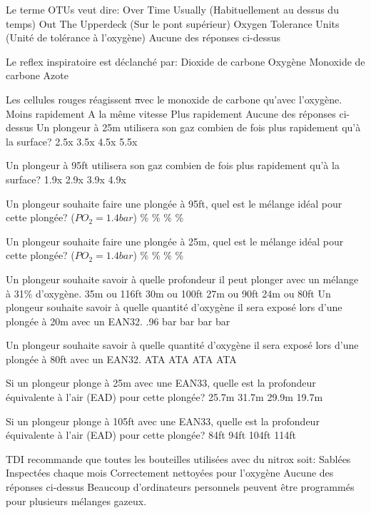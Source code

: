 \documentclass[english,10pt,a4paper, twoside]{article}
\begin{document}
\begin{outline}
		\1 Le terme OTUs veut dire:
			\2 Over Time Usually (Habituellement au dessus du temps)
			\2 Out The Upperdeck (Sur le pont supérieur)
			\2 Oxygen Tolerance Units (Unité de tolérance à l'oxygène)
			\2 Aucune des réponses ci-dessus

		\1 Le reflex inspiratoire est déclanché par:
			\2 Dioxide de carbone
			\2 Oxygène
			\2 Monoxide de carbone
			\2 Azote			

		\1 Les cellules rouges réagissent \st avec le monoxide de carbone qu'avec l'oxygène.
			\2 Moins rapidement
			\2 A la même vitesse
			\2 Plus rapidement
			\2 Aucune des réponses ci-dessus
		\1 Un plongeur à 25m utilisera son gaz combien de fois plus rapidement qu'à la surface?
			\2 2.5x
			\2 3.5x
			\2 4.5x
			\2 5.5x

		\1 Un plongeur à 95ft utilisera son gaz combien de fois plus rapidement qu'à la surface?
			\2 1.9x
			\2 2.9x
			\2 3.9x
			\2 4.9x

		\1 Un plongeur souhaite faire une plongée à 95ft, quel est le mélange idéal pour cette plongée? ($PO_2 = 1.4bar$)
			\%
			\%
			\%
			\%

		\1 Un plongeur souhaite faire une plongée à 25m, quel est le mélange idéal pour cette plongée? ($PO_2 = 1.4bar$)
			\%
			\%
			\%
			\%

		\1 Un plongeur souhaite savoir à quelle profondeur il peut plonger avec un mélange à 31\% d'oxygène.
			\2 35m ou 116ft
			\2 30m ou 100ft
			\2 27m ou 90ft
			\2 24m ou 80ft
		\1 Un plongeur souhaite savoir à quelle quantité d'oxygène il sera exposé lors d'une plongée à 20m avec un EAN32.
			\2 .96 bar
			\2 1.16 bar
			 bar
			 bar

		\1 Un plongeur souhaite savoir à quelle quantité d'oxygène il sera exposé lors d'une plongée à 80ft avec un EAN32.
			 ATA
			 ATA
			 ATA
			 ATA

		\1 Si un plongeur plonge à 25m avec une EAN33, quelle est la profondeur équivalente à l'air (EAD) pour cette plongée?
			\2 25.7m
			\2 31.7m
			\2 29.9m
			\2 19.7m

		\1 Si un plongeur plonge à 105ft avec une EAN33, quelle est la profondeur équivalente à l'air (EAD) pour cette plongée?
			\2 84ft
			\2 94ft
			\2 104ft
			\2 114ft

		\1 TDI recommande que toutes les bouteilles utilisées avec du nitrox soit:
			\2 Sablées
			\2 Inspectées chaque mois
			\2 Correctement nettoyées pour l'oxygène
			\2 Aucune des réponses ci-dessus
		\1 Beaucoup d'ordinateurs personnels peuvent être programmés pour plusieurs mélanges gazeux. \vf
		

\end{outline}
\end{document}
